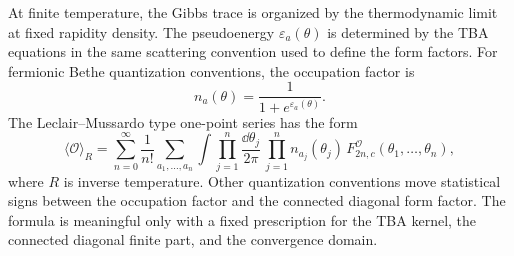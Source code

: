 At finite temperature, the Gibbs trace is organized by the thermodynamic
limit at fixed rapidity density.  The pseudoenergy
\(\varepsilon_a(\theta)\) is determined by the TBA equations in the same
scattering convention used to define the form factors.
For fermionic Bethe quantization conventions, the occupation factor is
\[
  n_a(\theta)=\frac{1}{1+e^{\varepsilon_a(\theta)}}.
\]
The Leclair--Mussardo type one-point series has the form
\begin{equation}
  \langle\mathcal O\rangle_R
  =
  \sum_{n=0}^{\infty}\frac{1}{n!}
  \sum_{a_1,\ldots,a_n}
  \int\prod_{j=1}^n\frac{\dd\theta_j}{2\pi}\,
  \prod_{j=1}^n n_{a_j}(\theta_j)\,
  F^{\mathcal O}_{2n,c}(\theta_1,\ldots,\theta_n),
  \label{eq:lm-connected-diagonal-series}
\end{equation}
where \(R\) is inverse temperature.  Other quantization conventions move
statistical signs between the occupation factor and the connected diagonal
form factor.  The formula is meaningful only with a fixed prescription for
the TBA kernel, the connected diagonal finite part, and the convergence
domain.


